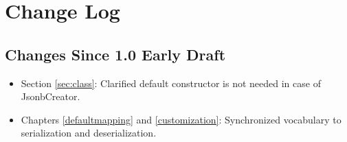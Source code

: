 \chapter{Change Log}

\section{Changes Since 1.0 Early Draft}

\begin{itemize}
\item Section \ref{sec:class}: Clarified default constructor is not needed in case of JsonbCreator.
\item Chapters \ref{defaultmapping} and \ref{customization}: Synchronized vocabulary to serialization and deserialization.
\end{itemize}
